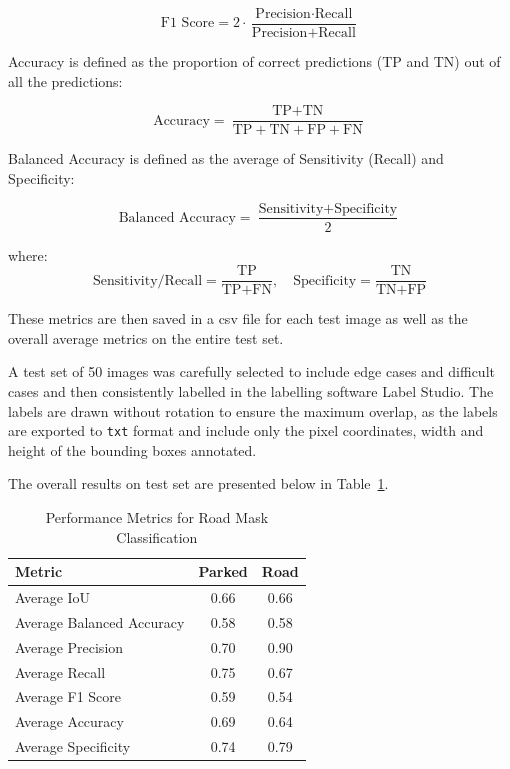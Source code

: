 \[
\text{F1 Score} = 2 \cdot \frac{\text{Precision} \cdot \text{Recall}}{\text{Precision} + \text{Recall}}
\]

Accuracy is defined as the proportion of correct predictions (TP and TN) out of all the predictions:

\[
\text{Accuracy} = \frac{\text{TP} + \text{TN}}{\text{TP} + \text{TN} + \text{FP} + \text{FN}}
\]

Balanced Accuracy is defined as the average of Sensitivity (Recall) and Specificity:

\[
\text{Balanced Accuracy} = \frac{\text{Sensitivity} + \text{Specificity}}{2}
\]

where:
\[
\text{Sensitivity/Recall} = \frac{\text{TP}}{\text{TP} + \text{FN}}, \quad
\text{Specificity} = \frac{\text{TN}}{\text{TN} + \text{FP}}
\]

These metrics are then saved in a csv file for each test image as well as the overall average metrics on the entire test set.

A test set of 50 images was carefully selected to include edge cases and difficult cases and then consistently labelled in the labelling software Label Studio. The labels are drawn without rotation to ensure the maximum overlap, as the labels are exported to \texttt{txt} format and include only the pixel coordinates, width and  height of the bounding boxes annotated.

The overall results on test set are presented below in Table~\ref{tab:metrics1}.

\begin{table}[htbp]
    \centering
    \begin{tabular}{|l|c|c|}
    \hline
    \textbf{Metric}               & \textbf{Parked} & \textbf{Road} \\ \hline
    Average IoU                  & 0.66         & 0.66              \\ \hline
    Average Balanced Accuracy    & 0.58         & 0.58              \\ \hline
    Average Precision            & 0.70         & 0.90              \\ \hline
    Average Recall               & 0.75         & 0.67              \\ \hline
    Average F1 Score             & 0.59         & 0.54              \\ \hline
    Average Accuracy             & 0.69         & 0.64              \\ \hline
    Average Specificity          & 0.74         & 0.79              \\ \hline
    \end{tabular}
    \caption{Performance Metrics for Road Mask Classification}
    \label{tab:metrics1}
\end{table}

